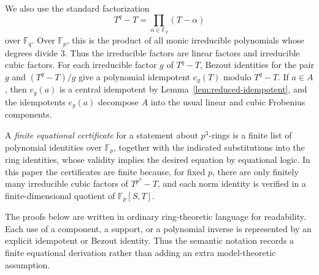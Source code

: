 We also use the standard factorization
\[
  T^q-T=\prod_{\alpha\in \mathbb F_q}(T-\alpha)
\]
over \(\mathbb F_q\).  Over \(\mathbb F_p\), this is the product of all monic irreducible polynomials whose degrees divide \(3\).  Thus the irreducible factors are linear factors and irreducible cubic factors.  For each irreducible factor \(g\) of \(T^q-T\), Bezout identities for the pair \(g\) and \((T^q-T)/g\) give a polynomial idempotent \(e_g(T)\) modulo \(T^q-T\).  If \(a\in A\), then \(e_g(a)\) is a central idempotent by Lemma~\ref{lem:reduced-idempotent}, and the idempotents \(e_g(a)\) decompose \(A\) into the usual linear and cubic Frobenius components.

\begin{definition}\label{def:certificate}
  A \emph{finite equational certificate} for a statement about \(p^3\)-rings is a finite list of polynomial identities over \(\mathbb F_p\), together with the indicated substitutions into the ring identities, whose validity implies the desired equation by equational logic.  In this paper the certificates are finite because, for fixed \(p\), there are only finitely many irreducible cubic factors of \(T^{p^3}-T\), and each norm identity is verified in a finite-dimensional quotient of \(\mathbb F_p[S,T]\).
\end{definition}

\begin{remark}\label{rem:semantic-language}
  The proofs below are written in ordinary ring-theoretic language for readability.  Each use of a component, a support, or a polynomial inverse is represented by an explicit idempotent or Bezout identity.  Thus the semantic notation records a finite equational derivation rather than adding an extra model-theoretic assumption.
\end{remark}
